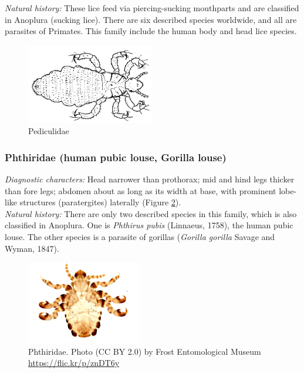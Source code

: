 \documentclass[letterpaper, 11pt]{article}
\begin{document}
\noindent{}\textit{Natural history:} These lice feed via piercing-sucking mouthparts and are classified in Anoplura (sucking lice). There are six described species worldwide, and all are parasites of Primates. This family include the human body and head lice species.\\

\begin{figure}[ht!]
 \centering
 \includegraphics[width=0.5\textwidth]{Pediculidae.png}
 \caption{Pediculidae \citep[][Fig. 13A]{snodgrass1944feeding}}
 \label{fig:pediculid}
\end{figure}

\subsubsection{Phthiridae (human pubic louse, Gorilla louse)}
\noindent{}\textit{Diagnostic characters:} Head narrower than prothorax; mid and hind legs thicker than fore legs; abdomen about as long as its width at base, with prominent lobe-like structures (paratergites) laterally (Figure \ref{fig:phthirid}).\\

\noindent{}\textit{Natural history:} There are only two described species in this family, which is also classified in Anoplura. One is \textit{Phthirus pubis} (Linnaeus, 1758), the human pubic louse. The other species is a parasite of gorillas (\textit{Gorilla gorilla} Savage and Wyman, 1847).\\

\begin{figure}[ht!]
 \centering
 \includegraphics[width=0.45\textwidth]{PhthiridHabitus}
 \caption{Phthiridae. Photo (CC BY 2.0) by Frost Entomological Museum \url{https://flic.kr/p/znDT6y}}
 \label{fig:phthirid}
\end{figure}
\end{document}
